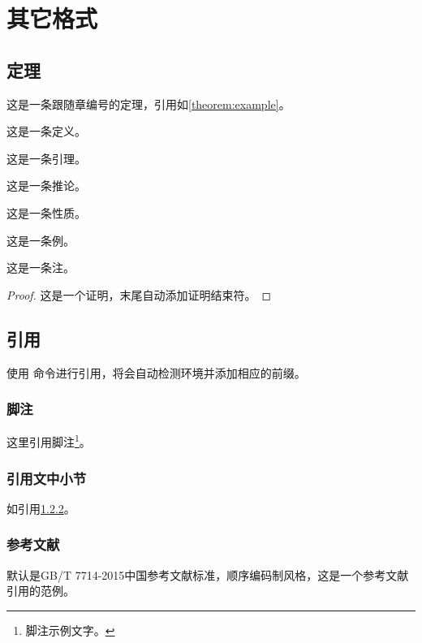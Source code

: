 
\chapter{其它格式}

\section{定理}
\begin{theorem}[（中文括号）]\label{theorem:example}
	这是一条跟随章编号的定理，引用如\cref{theorem:example}。
\end{theorem}
\begin{definition}
	这是一条定义。
\end{definition}
\begin{lemma}
	这是一条引理。
\end{lemma}
\begin{corollary}
	这是一条推论。
\end{corollary}
\begin{proposition}
	这是一条性质。
\end{proposition}
\begin{example}
	这是一条例。
\end{example}
\begin{remark}
	这是一条注。
\end{remark}
\begin{proof}
	这是一个证明，末尾自动添加证明结束符。
\end{proof}

\section{引用}
使用 \concise{\cref} 命令进行引用，将会自动检测环境并添加相应的前缀。

\subsection{脚注}
这里引用脚注\footnote{脚注示例文字。}。

\subsection{引用文中小节}\label{subsec:example}
如引用\cref{subsec:example}。

\subsection{参考文献}
默认是GB/T 7714-2015中国参考文献标准，顺序编码制风格，这是一个参考文献引用的范例\cite{1979Prospect}。

